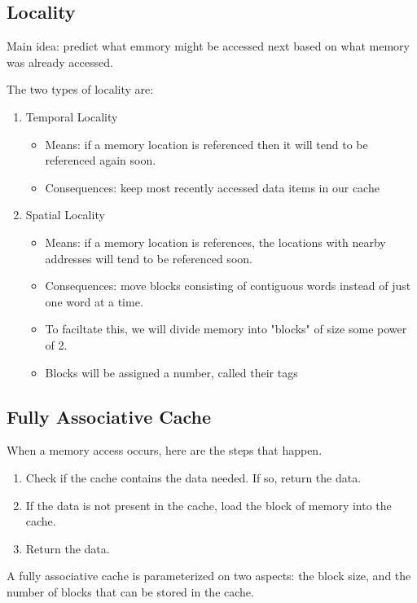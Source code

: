 \documentclass[12pt]{article}
\begin{document}
\subsection*{Locality}
Main idea: predict what emmory might be accessed next based on what memory was already accessed.

The two types of locality are:
\begin{enumerate}
    \item Temporal Locality
          \begin{itemize}
              \item Means: if a memory location is referenced then it will tend to be referenced again soon.
              \item Consequences: keep most recently accessed data items in our cache
          \end{itemize}
    \item Spatial Locality
          \begin{itemize}
              \item Means: if a memory location is references, the locations with nearby addresses will tend to be referenced soon.
              \item Consequences: move blocks consisting of contiguous words instead of just one word at a time.
              \item To faciltate this, we will divide memory into "blocks" of size some power of 2.
              \item Blocks will be assigned  a number, called their tags
          \end{itemize}
\end{enumerate}

\subsection*{Fully Associative Cache}
When a memory access occurs, here are the steps that happen.
\begin{enumerate}
    \item Check if the cache contains the data needed. If so, return the data.
    \item If the data is not present in the cache, load the block of memory into the cache.
    \item Return the data.
\end{enumerate}
A fully associative cache is parameterized on two aspects: the block size, and the number of blocks that can be stored in the cache.
\end{document}
